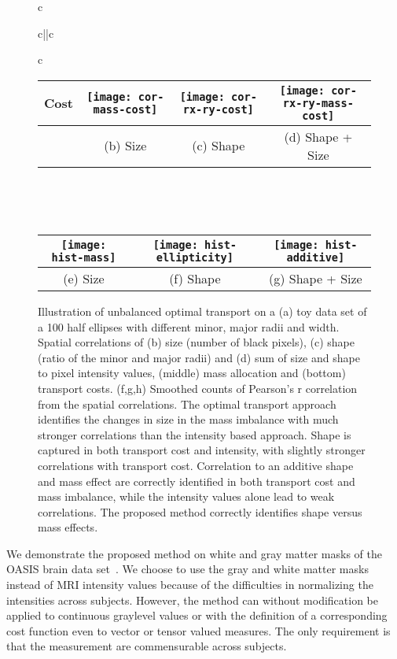 \documentclass{llncs}
\begin{document}
\begin{figure}[bht]
\begin{tabular}{c}
\begin{tabular}{c||c}
\begin{tabular}{c}
\begin{tabular}{l|c|c|c}
Cost&
\texttt{[image: cor-mass-cost]} &
\texttt{[image: cor-rx-ry-cost]} &
\texttt{[image: cor-rx-ry-mass-cost]} \\ \hline 
        & (b) Size 
        & (c) Shape 
        & (d) Shape + Size 
\end{tabular}
\end{tabular}\\
\end{tabular}
        \\ \hline \hline 
\begin{tabular}{c|c|c}
\texttt{[image: hist-mass]} &
\texttt{[image: hist-ellipticity]} &
\texttt{[image: hist-additive]} \\ \hline 
        (e) Size & (f) Shape & (g) Shape + Size
\end{tabular}
\end{tabular}
\caption{\label{fig:cor-ellipse}
Illustration of unbalanced optimal transport on a (a) toy data set of a 100
half ellipses with different minor, major radii and width.  Spatial
correlations of (b) size (number of black pixels), (c) shape (ratio of the
minor and major radii) and (d) sum of size and shape to pixel
intensity values, (middle) mass allocation and (bottom) transport costs.
(f,g,h) Smoothed counts of Pearson's r correlation from the spatial
correlations. The optimal transport approach identifies the changes in size in
the mass imbalance with much stronger correlations than the intensity based
approach.  Shape is captured in both transport cost and intensity, with
slightly stronger correlations with transport cost. Correlation to an additive
shape and mass effect are correctly identified in both transport cost and mass
imbalance, while the intensity values alone lead to weak correlations. The
proposed method correctly identifies shape versus mass effects.  
}
\end{figure}

We demonstrate the proposed method on white and gray matter masks of the OASIS
brain data set~\citep{marcus2010open}. We choose to use the gray and white
matter masks instead of MRI intensity values because of the difficulties in
normalizing the intensities across subjects. However, the method can without
modification be applied to continuous graylevel values or with the definition
of a corresponding cost function even to vector or tensor valued measures. The
only requirement is that the measurement are commensurable across subjects.
\end{document}
